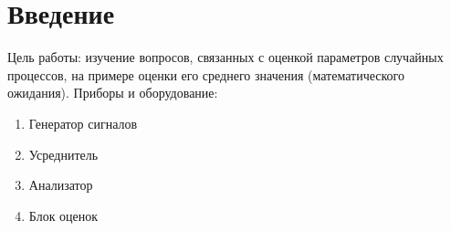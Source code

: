

\def\labauthors{Есюнин Д.В., Есюнин М.В.}
\def\labgroup{440}
\def\labnumber{1}
\def\labtheme{Оценивание параметров случайного процесса}

\newpage

\section{Введение}%
Цель работы: изучение вопросов, связанных с оценкой параметров случайных процессов, на примере оценки его среднего значения (математического ожидания).
Приборы и оборудование:
\begin{enumerate}
	\item Генератор сигналов
	\item Усреднитель
	\item Анализатор
	\item Блок оценок
\end{enumerate}

